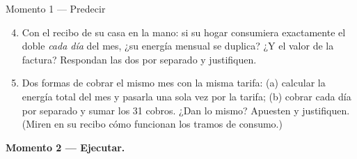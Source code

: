 \documentclass[12pt,letterpaper]{article}
\begin{document}
\begin{cajaprediccion}{Momento 1 --- Predecir}
\begin{enumerate}[label=P\arabic*., itemsep=0.1em]
    \setcounter{enumi}{3}
    \item Con el recibo de su casa en la mano: si su hogar consumiera exactamente el doble \emph{cada día} del mes, ¿su energía mensual se duplica? ¿Y el valor de la factura? Respondan las dos por separado y justifiquen.
    \item Dos formas de cobrar el mismo mes con la misma tarifa: (a) calcular la energía total del mes y pasarla una sola vez por la tarifa; (b) cobrar cada día por separado y sumar los 31 cobros. ¿Dan lo mismo? Apuesten y justifiquen. (Miren en su recibo cómo funcionan los tramos de consumo.)
\end{enumerate}
\end{cajaprediccion}

\textbf{Momento 2 --- Ejecutar.}
\end{document}
